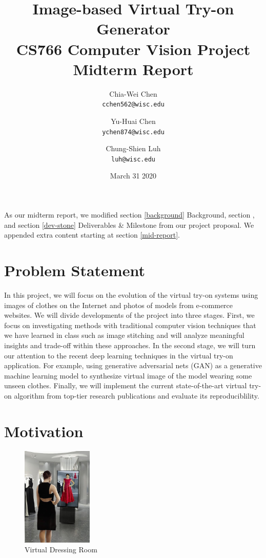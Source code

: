 \documentclass{article}
\date{March 31 2020}
\author{
  Chia-Wei Chen\\
  \texttt{cchen562@wisc.edu}
  \and
  Yu-Huai Chen\\
  \texttt{ychen874@wisc.edu}
  \and
  Chung-Shien Luh\\
  \texttt{luh@wisc.edu}
}
\title{
Image-based Virtual Try-on Generator\\
\large CS766 Computer Vision Project Midterm Report
}
\begin{document}
\maketitle

{
As our midterm report, we modified section \ref{background} Background, section \label{eval}, and section \ref{dev-stone} Deliverables \& Milestone from our project proposal. We appended extra content starting at section \ref{mid-report}.
}

\section{Problem Statement}

In this project, we will focus on the evolution of the virtual try-on systems using images of clothes on the Internet and photos of models from e-commerce websites. We will divide developments of the project into three stages. First, we focus on investigating methods with traditional computer vision techniques that we have learned in class such as image stitching and will analyze meaningful insights and trade-off within these approaches. In the second stage, we will turn our attention to the recent deep learning techniques in the virtual try-on application. For example, using generative adversarial nets (GAN) \cite{goodfellow2014generative} as a generative machine learning model to synthesize virtual image of the model wearing some unseen clothes. Finally, we will implement the current state-of-the-art virtual try-on algorithm from top-tier research publications and evaluate its reproduciblility.


\section{Motivation}

\begin{figure}[h]
    \centering
    \includegraphics[width=0.3\textwidth]{fit-ar.jpg}
    \caption{Virtual Dressing Room \cite{vdr}}
\end{figure}
\end{document}
